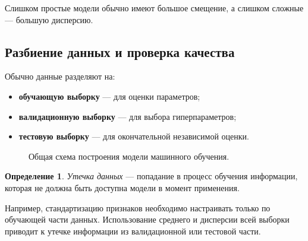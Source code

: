 \documentclass[12pt,a4paper]{article}
\theoremstyle{definition}
\newtheorem{definition}[theorem]{Определение}
\theoremstyle{remark}
\begin{document}
Слишком простые модели обычно имеют большое смещение, а слишком сложные ---
большую дисперсию.

\subsection{Разбиение данных и проверка качества}

Обычно данные разделяют на:

\begin{itemize}
    \item \textbf{обучающую выборку} --- для оценки параметров;
    \item \textbf{валидационную выборку} --- для выбора гиперпараметров;
    \item \textbf{тестовую выборку} --- для окончательной независимой оценки.
\end{itemize}

\begin{figure}[ht]
\centering
{}
\caption{Общая схема построения модели машинного обучения.}
\end{figure}

\begin{definition}
\emph{Утечка данных} --- попадание в процесс обучения информации, которая
не должна быть доступна модели в момент применения.
\end{definition}

Например, стандартизацию признаков необходимо настраивать только по
обучающей части данных. Использование среднего и дисперсии всей выборки
приводит к утечке информации из валидационной или тестовой части.
\end{document}
